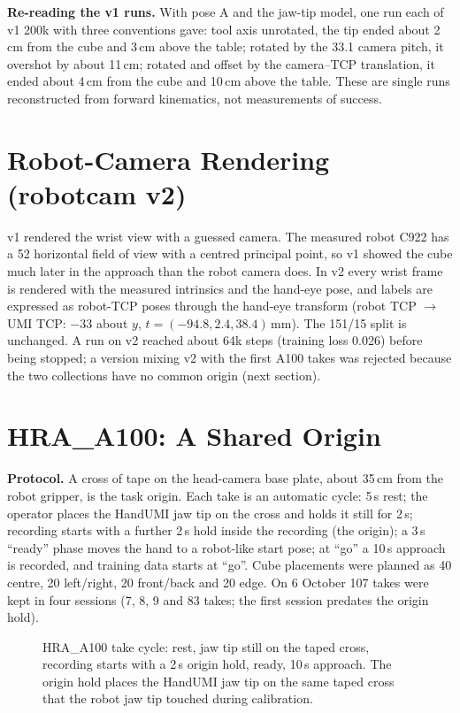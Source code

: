 \documentclass[conference,10pt]{IEEEtran}
\newcommand{\mm}{\,mm\xspace}
\begin{document}
\textbf{Re-reading the v1 runs.} With pose A and the jaw-tip model, one run each of v1 200k with three conventions gave: tool
axis unrotated, the tip ended about 2\,cm from the cube and 3\,cm above the table; rotated by the 33.1\textdegree{} camera
pitch, it overshot by about 11\,cm; rotated and offset by the camera--TCP translation, it ended about 4\,cm from the cube and
10\,cm above the table. These are single runs reconstructed from forward kinematics, not measurements of success.

\section{Robot-Camera Rendering (robotcam v2)}\label{sec:v2}
v1 rendered the wrist view with a guessed camera. The measured robot C922 has a 52\textdegree{} horizontal field of view with
a centred principal point, so v1 showed the cube much later in the approach than the robot camera does. In v2 every wrist
frame is rendered with the measured intrinsics and the hand-eye pose, and labels are expressed as robot-TCP poses through the
hand-eye transform (robot TCP $\to$ UMI TCP: $-33$\textdegree{} about $y$, $t=(-94.8, 2.4, 38.4)$\mm). The 151/15 split is
unchanged. A run on v2 reached about 64k steps (training loss 0.026) before being stopped; a version mixing v2 with the first
A100 takes was rejected because the two collections have no common origin (next section).

\section{HRA\_A100: A Shared Origin}\label{sec:a100}
\textbf{Protocol.} A cross of tape on the head-camera base plate, about 35\,cm from the robot gripper, is the task origin.
Each take is an automatic cycle: 5\,s rest; the operator places the HandUMI jaw tip on the cross and holds it still for
2\,s; recording starts with a further 2\,s hold inside the recording (the origin); a 3\,s ``ready'' phase moves the hand to a
robot-like start pose; at ``go'' a 10\,s approach is recorded, and training data starts at ``go''. Cube placements were planned
as 40 centre, 20 left/right, 20 front/back and 20 edge. On 6 October 107 takes were kept in four sessions (7, 8, 9 and 83
takes; the first session predates the origin hold).

\begin{figure}[t]
\centering
{}
\caption{HRA\_A100 take cycle: rest, jaw tip still on the taped cross, recording starts with a 2\,s origin hold, ready, 10\,s approach. The origin hold places the HandUMI jaw tip on the same taped cross that the robot jaw tip touched
during calibration.}
\label{fig:protocol}
\end{figure}
\end{document}
